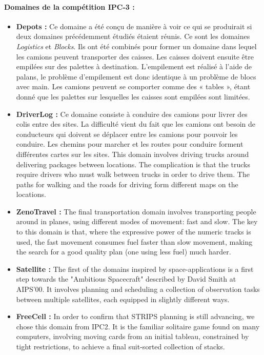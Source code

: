 \paragraph*{Domaines de la compétition IPC-3 :}
\begin{itemize}
\item \textbf{Depots :}
Ce domaine a été conçu de manière à voir ce qui se produirait si deux domaines précédemment étudiés étaient réunis. Ce sont les domaines \textit{Logistics} et \textit{Blocks}. Ils ont été combinés pour former un domaine dans lequel les camions peuvent transporter des caisses. Les caisses doivent ensuite être empilées sur des palettes à destination. L'empilement est réalisé à l'aide de palans, le problème d'empilement est donc identique à un problème de blocs avec main. Les camions peuvent se comporter comme des « tables », étant donné que les palettes sur lesquelles les caisses sont empilées sont limitées.
\item \textbf{DriverLog :}
Ce domaine consiste à conduire des camions pour livrer des colis entre des sites. La difficulté vient du fait que les camions ont besoin de conducteurs qui doivent se déplacer entre les camions pour pouvoir les conduire. Les chemins pour marcher et les routes pour conduire forment différentes cartes sur les sites.
{\color{red}This domain involves driving trucks around delivering packages between locations. The complication is that the trucks require drivers who must walk between trucks in order to drive them. The paths for walking and the roads for driving form different maps on the locations.}
\item \textbf{ZenoTravel :}
{\color{red}The final transportation domain involves transporting people around in planes, using different modes of movement: fast and slow. The key to this domain is that, where the expressive power of the numeric tracks is used, the fast movement consumes fuel faster than slow movement, making the search for a good quality plan (one using less fuel) much harder.}
\item \textbf{Satellite :}
{\color{red}The first of the domains inspired by space-applications is a first step towards the "Ambitious Spacecraft" described by David Smith at AIPS'00. It involves planning and scheduling a collection of observation tasks between multiple satellites, each equipped in slightly different ways.}
\item \textbf{FreeCell :}
{\color{red}In order to confirm that STRIPS planning is still advancing, we chose this domain from IPC2. It is the familiar solitaire game found on many computers, involving moving cards from an initial tableau, constrained by tight restrictions, to achieve a final suit-sorted collection of stacks.}
\end{itemize}

